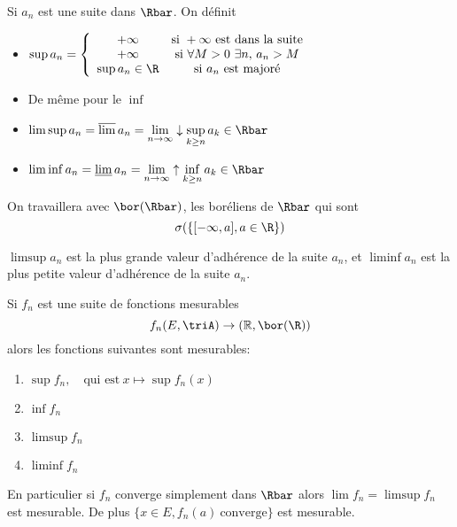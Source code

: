 \begin{definition}
	Si $a_n$ est une suite dans $\Rbar$. On définit
	\begin{itemize}
		\item $\sup a_n =
			      \left\{ \begin{array}{cc}
				      +\infty         & \text{si} \ +\infty \ \text{est dans la suite}   \\
				      +\infty         & \text{si} \ \forall M > 0 \ \exists n,\, a_n > M \\
				      \sup a_n \in \R & \text{si} \ a_n\  \text{est majoré}
			      \end{array}\right.$

		\item De même pour le $\inf$
		\item $\limsup a_n = \varlimsup a_n = \lim\limits_{n \to \infty}\downarrow \sup\limits_{k \geq n } a_k \in \Rbar$
		\item $\liminf a_n = \varliminf a_n = \lim\limits_{n \to \infty}\uparrow \inf\limits_{k \geq n } a_k \in \Rbar$
	\end{itemize}
\end{definition}


\begin{remarque}
	On travaillera avec $\bor(\Rbar)$, les boréliens de $\Rbar$ qui sont
	$$\sigma (\left\{[-\infty, a], a \in \R\right\})$$
\end{remarque}


\begin{remarque}
	$\limsup a_n$ est la plus grande valeur d'adhérence de la suite $a_n$, et
	$\liminf a_n$ est la plus petite valeur d'adhérence de la suite $a_n$.
\end{remarque}

\begin{prop}
	Si $f_n$ est une suite de fonctions mesurables
	$$f_n (E,\triA) \rightarrow (\mathbb{R},\bor(\R))$$
	alors les fonctions suivantes sont mesurables:
	\begin{enumerate}
		\item $\sup f_n, \quad \text{qui est} \ x\mapsto \sup f_n(x) $
		\item $\inf f_n$
		\item $\limsup f_n$
		\item $\liminf f_n$
	\end{enumerate}
	En particulier si $f_n$ converge simplement dans $\Rbar$ alors
	$\lim f_n = \limsup f_n$ est mesurable. De plus $\{ x \in E, f_n(a) \ \text{converge}\}$ est mesurable.
\end{prop}

